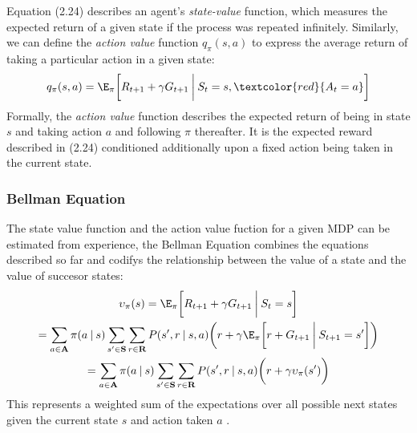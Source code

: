 Equation (2.24) describes an agent's \emph{state-value} function, which measures
the expected return of a given state if the process was repeated infinitely. Similarly,
we can define the \emph{action value} function $q_\pi(s,a)$ to express the average return
of taking a particular action in a given state:
\begin{equation}
    q_\pi(s,a) = \E_\pi \biggl [R_{t+1} + \gamma G_{t+1} \: \biggl | \: S_t = s,\textcolor{red}{ A_t = a} \biggl]
\end{equation}
Formally, the \emph{action value} function describes the expected return of being in state $s$ and taking
action $a$ and following $\pi$ thereafter. It is the expected reward described in (2.24) conditioned
additionally upon a fixed action being taken in the current state.
\subsubsection{Bellman Equation}
The state value function and the action value fuction for a given MDP can be estimated from
experience, the Bellman Equation combines the equations described so far and codifys
the relationship between the value of a state and the value of succesor states:
\begin{equation}
    \begin{gathered}
        \upsilon_\pi(s) = \E_\pi \biggl[ R_{t+1} + \gamma G_{t+1}\: \biggl | \: S_t = s  \biggl ] \\
        = \sum_{a \in \mathbf{A}} \pi(a \: | \: s) \sum_{s' \in \mathbf{S}} \sum_{r\in \mathbf{R}}P(s',r \: | \: s,a) \biggl(r + \gamma \E_\pi \biggl [r + G_{t+1} \: \biggl | \: S_{t+1} = s' \biggl] \biggl)\\
        =\sum_{a \in \mathbf{A}} \pi(a \: | \: s) \sum_{s' \in \mathbf{S}} \sum_{r\in \mathbf{R}}P(s',r \: | \: s,a) \biggl(r + \gamma \upsilon_\pi(s') \biggl )
    \end{gathered}
\end{equation}
This represents a weighted sum of the expectations over all possible next states given the current state
$s$ and action taken $a$ \cite{sutton2018reinforcement}.
